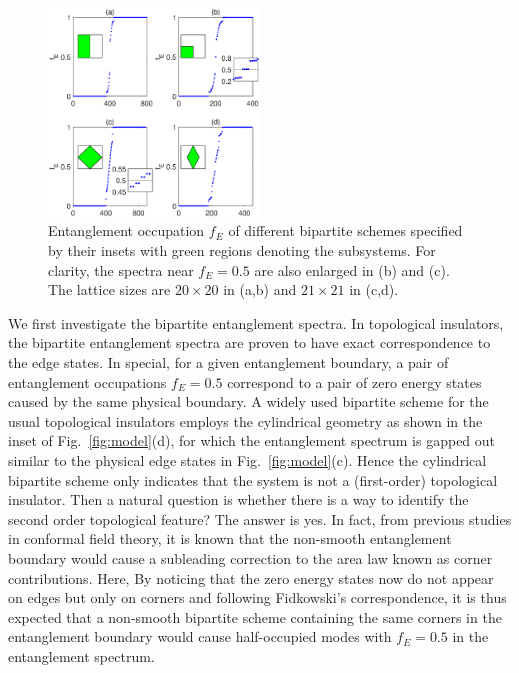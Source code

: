 \documentclass[doublecol]{epl2} %
\begin{document}
\begin{figure}
	\includegraphics[width=0.5\textwidth]{subshape.eps}
	\caption{\label{fig:subshape} Entanglement occupation $f_E$ of different bipartite schemes specified by their insets with green regions denoting the subsystems. For clarity, the spectra near $f_E=0.5$ are also enlarged in (b) and (c). The lattice sizes are $20\times20$ in (a,b) and $21\times21$ in (c,d).}
\end{figure}

We first investigate the bipartite entanglement spectra. In topological insulators, the bipartite entanglement spectra are proven to have exact correspondence to the edge states. \cite{Fidkowski_PRL_2010} In special, for a given entanglement boundary, a pair of entanglement occupations $f_{E}=0.5$ correspond to a pair of zero energy states caused by the same physical boundary. A widely used bipartite scheme for the usual topological insulators employs the cylindrical geometry as shown in the inset of Fig.~\ref{fig:model}(d), for which the entanglement spectrum is gapped out similar to the physical edge states in Fig.~\ref{fig:model}(c). Hence the cylindrical bipartite scheme only indicates that the system is not a (first-order) topological insulator. Then a natural question is whether there is a way to identify the second order topological feature? The answer is yes. In fact, from previous studies in conformal field theory, it is known that the non-smooth entanglement boundary would cause a subleading correction to the area law known as corner contributions. \cite{Laflorencie_PR_2016} Here, By noticing that the zero energy states now do not appear on edges but only on corners and following Fidkowski's correspondence, it is thus expected that a non-smooth bipartite scheme containing the same corners in the entanglement boundary would cause half-occupied modes with $f_E=0.5$ in the entanglement spectrum.
\end{document}
